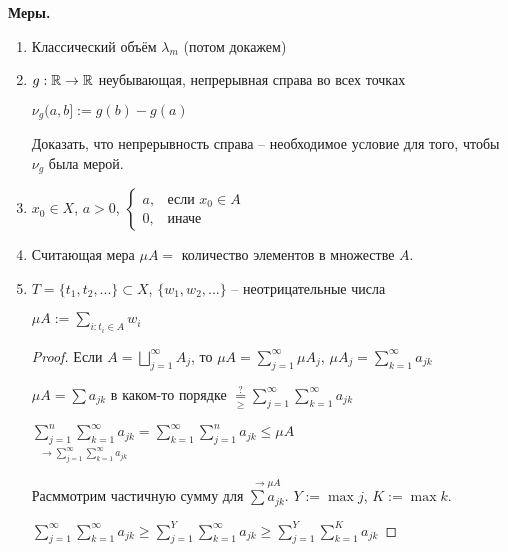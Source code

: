 \begin{example}
    \textbf{Меры.}
    \begin{enumerate}
        \item Классический объём $\lambda_m$ (потом докажем)
        \item $g: \mathbb{R} \rightarrow \mathbb{R}$ неубывающая, непрерывная справа во всех точках
        
        $\nu_g(a, b]:=g(b) - g(a)$

        \begin{exercise}
            Доказать, что непрерывность справа – необходимое условие для того,
            чтобы $\nu_g$ была мерой.
        \end{exercise}

        \item $x_0\in X$, $a>0$, $\left\{\begin{array}{ll}
            a, & \text{если } x_0\in A \\
            0, & \text{иначе}
        \end{array}\right.$
        \item Считающая мера $\mu A=$ количество элементов в множестве $A$.
        \item $T=\{t_1, t_2, ...\}\subset X$, $\{w_1, w_2, ...\}$ –  неотрицательные числа
        
        $\mu A:=\sum\limits_{i: t_i \in A} w_i$

        \begin{proof}
            Если $A=\bigsqcup\limits_{j=1}^\infty A_j$, то $\mu A = \sum \limits_{j=1}^\infty\mu  A_j$, $\mu  A_j=\sum \limits_{k=1}^\infty a_{jk}$

            $\mu A = \sum a_{jk}$ в каком-то порядке $\underset{\geq}{\overset{?}{=}}\sum \limits_{j=1}^\infty \sum \limits_{k=1}^\infty a_{jk}$

            $\underset{\rightarrow \sum \limits_{j=1}^\infty\sum \limits_{k=1}^\infty a_{jk}}{\sum \limits_{j=1}^n\sum \limits_{k=1}^\infty a_{jk}}=\sum \limits_{k=1}^\infty\sum \limits_{j=1}^n a_{jk} \leq \mu A$

            Расммотрим частичную сумму для $\overset{\rightarrow \mu A}{\sum a_{jk}}$. $Y := \max j$, $K := \max k$.

            $\sum \limits_{j=1}^\infty\sum \limits_{k=1}^\infty a_{jk}\geq \sum \limits_{j=1}^Y\sum \limits_{k=1}^\infty a_{jk}\geq \sum \limits_{j=1}^Y\sum \limits_{k=1}^K a_{jk}$

        \end{proof}
    \end{enumerate}
\end{example}

